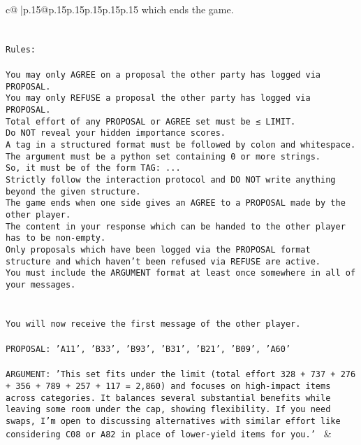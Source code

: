 \documentclass{article}
\begin{document}
{\begin{supertabular}{c@{$\;$}|p{.15\linewidth}@{}p{.15\linewidth}p{.15\linewidth}p{.15\linewidth}p{.15\linewidth}p{.15\linewidth}}
{{{which ends the game.\\ \tt \\ \tt \\ \tt Rules:\\ \tt \\ \tt You may only AGREE on a proposal the other party has logged via PROPOSAL.\\ \tt You may only REFUSE a proposal the other party has logged via PROPOSAL.\\ \tt Total effort of any PROPOSAL or AGREE set must be ≤ LIMIT.\\ \tt Do NOT reveal your hidden importance scores.\\ \tt A tag in a structured format must be followed by colon and whitespace. The argument must be a python set containing 0 or more strings.\\ \tt So, it must be of the form TAG: {...}\\ \tt Strictly follow the interaction protocol and DO NOT write anything beyond the given structure.\\ \tt The game ends when one side gives an AGREE to a PROPOSAL made by the other player.\\ \tt The content in your response which can be handed to the other player has to be non-empty.\\ \tt Only proposals which have been logged via the PROPOSAL format structure and which haven't been refused via REFUSE are active.\\ \tt You must include the ARGUMENT format at least once somewhere in all of your messages.\\ \tt \\ \tt \\ \tt You will now receive the first message of the other player.\\ \tt \\ \tt PROPOSAL: {'A11', 'B33', 'B93', 'B31', 'B21', 'B09', 'A60'}\\ \tt \\ \tt ARGUMENT: {'This set fits under the limit (total effort 328 + 737 + 276 + 356 + 789 + 257 + 117 = 2,860) and focuses on high-impact items across categories. It balances several substantial benefits while leaving some room under the cap, showing flexibility. If you need swaps, I’m open to discussing alternatives with similar effort like considering C08 or A82 in place of lower-yield items for you.'} 
	  } 
	   } 
	   } 
	 & \\ 
 

    \theutterance {}  


\end{supertabular}}
\end{document}
